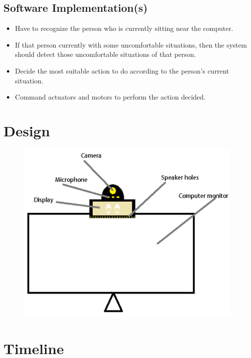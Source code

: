\documentclass{article}
\begin{document}
	\subsection{Software Implementation(s)}
	\begin{itemize}
		\item Have to recognize the person who is currently sitting near the computer.
		\item If that person currently with some uncomfortable situations, then the system should detect those uncomfortable situations of that person.
		\item Decide the most suitable action to do according to the person's current situation.
		\item Command actuators and motors to perform the action decided.
	\end{itemize}
	
	\section{Design}
	\begin{figure}[H]
		\centering
		\includegraphics[width=1\textwidth]{design.png}
		\\[25pt]
	\end{figure}
	
	\section{Timeline}
	\begin{landscape}
		
	\end{landscape}
	
\end{document}
